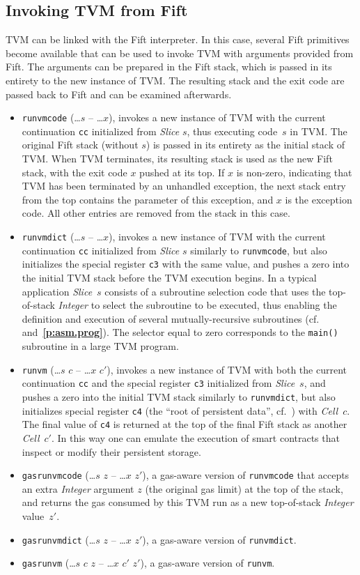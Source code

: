 \documentclass[12pt,oneside]{article}
\def\refpoint#1{{\rm\textbf{\ref{#1}}}}
\let\ptref=\refpoint
\def\mysubsection#1{\subsection{#1}\fancyhead[C]{\small{\textsc{\textrm{\thesubsection.} #1}}}}
\begin{document}
\mysubsection{Invoking TVM from Fift}\label{p:tvm.ops}
TVM can be linked with the Fift interpreter. In this case, several Fift primitives become available that can be used to invoke TVM with arguments provided from Fift. The arguments can be prepared in the Fift stack, which is passed in its entirety to the new instance of TVM. The resulting stack and the exit code are passed back to Fift and can be examined afterwards.
\begin{itemize}
\item {\tt runvmcode} (\dots $s$ -- \dots $x$), invokes a new instance of TVM with the current continuation {\tt cc} initialized from {\em Slice\/} $s$, thus executing code~$s$ in TVM. The original Fift stack (without $s$) is passed in its entirety as the initial stack of TVM. When TVM terminates, its resulting stack is used as the new Fift stack, with the exit code $x$ pushed at its top. If $x$ is non-zero, indicating that TVM has been terminated by an unhandled exception, the next stack entry from the top contains the parameter of this exception, and $x$ is the exception code. All other entries are removed from the stack in this case.
\item {\tt runvmdict} (\dots $s$ -- \dots $x$), invokes a new instance of TVM with the current continuation {\tt cc} initialized from {\em Slice\/} $s$ similarly to {\tt runvmcode}, but also initializes the special register {\tt c3} with the same value, and pushes a zero into the initial TVM stack before the TVM execution begins. In a typical application {\em Slice\/}~$s$ consists of a subroutine selection code that uses the top-of-stack {\em Integer\/} to select the subroutine to be executed, thus enabling the definition and execution of several mutually-recursive subroutines (cf.~\cite[4.6]{TVM} and~\ptref{p:asm.prog}). The selector equal to zero corresponds to the {\tt main()} subroutine in a large TVM program.
\item {\tt runvm} (\dots $s$ $c$ -- \dots $x$ $c'$), invokes a new instance of TVM with both the current continuation {\tt cc} and the special register {\tt c3} initialized from {\em Slice\/}~$s$, and pushes a zero into the initial TVM stack similarly to {\tt runvmdict}, but also initializes special register {\tt c4} (the ``root of persistent data'', cf.~\cite[1.4]{TVM}) with {\em Cell\/}~$c$. The final value of {\tt c4} is returned at the top of the final Fift stack as another {\em Cell\/}~$c'$. In this way one can emulate the execution of smart contracts that inspect or modify their persistent storage.
\item {\tt gasrunvmcode} (\dots $s$ $z$ -- \dots $x$ $z'$), a gas-aware version of {\tt runvmcode} that accepts an extra {\em Integer\/} argument $z$ (the original gas limit) at the top of the stack, and returns the gas consumed by this TVM run as a new top-of-stack {\em Integer\/} value~$z'$.
\item {\tt gasrunvmdict} (\dots $s$ $z$ -- \dots $x$ $z'$), a gas-aware version of {\tt runvmdict}.
\item {\tt gasrunvm} (\dots $s$ $c$ $z$ -- \dots $x$ $c'$ $z'$), a gas-aware version of {\tt runvm}.
\end{itemize}
\end{document}
